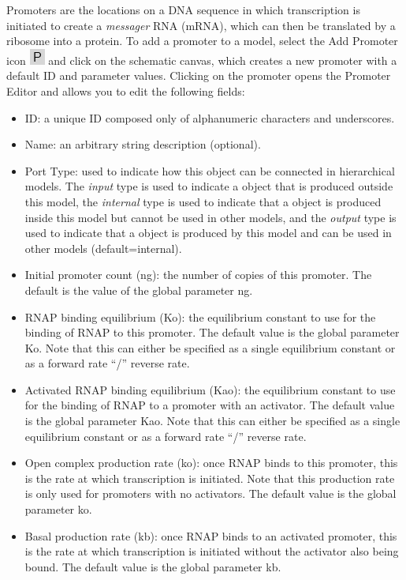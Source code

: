 \documentclass[titlepage,11pt]{article}
\begin{document}
\noindent
Promoters are the locations on a DNA sequence in which transcription is initiated to create a \emph{messager} RNA (mRNA), which can then be translated by a ribosome into a protein.  To add a promoter to a model, select the Add Promoter icon \includegraphics{../gui/icons/modelview/promoter_mode_selected} and click on the schematic canvas, which creates a new promoter with a default ID and parameter values.  Clicking on the promoter opens the Promoter Editor and allows you to edit the following fields:
\begin{itemize}
\item ID: a unique ID composed only of alphanumeric characters and underscores.
\item Name: an arbitrary string description (optional).
\item Port Type: used to indicate how this object can be connected in hierarchical models.  The \emph{input} type is used to indicate a object that is produced outside this model, the \emph{internal} type is used to indicate that a object is produced inside this model but cannot be used in other models, and the \emph{output} type is used to indicate that a object is produced by this model and can be used in other models (default=internal). 
\item Initial promoter count (ng): the number of copies of this promoter.  The default is the value of the global parameter ng.   
\item RNAP binding equilibrium (Ko): the equilibrium constant to use for the binding of RNAP to this promoter.  The default value is the global parameter Ko.  Note that this can either be specified as a single equilibrium constant or as a forward rate ``/'' reverse rate.
\item Activated RNAP binding equilibrium (Kao): the equilibrium constant to use for the binding of RNAP to a promoter with an activator.  The default value is the global parameter Kao.  Note that this can either be specified as a single equilibrium constant or as a forward rate ``/'' reverse rate.
\item Open complex production rate (ko): once RNAP binds to this promoter, this is the rate at which transcription is initiated.  Note that this production rate is only used for promoters with no activators.  The default value is the global parameter ko.
\item Basal production rate (kb): once RNAP binds to an activated promoter, this is the rate at which transcription is initiated without the activator also being bound.  The default value is the global parameter kb.

\end{itemize}
\end{document}
